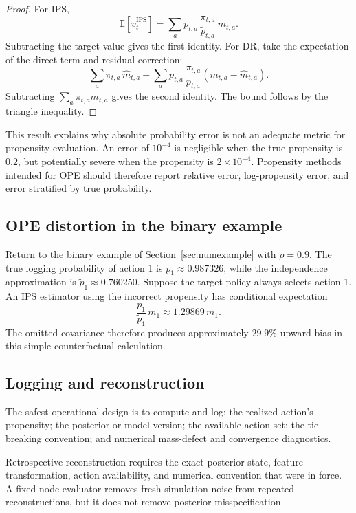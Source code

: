 \documentclass[11pt]{article}
\newcommand{\E}{\mathbb{E}}
\begin{document}
\begin{proof}
For IPS,
\[
\E[\widetilde v_t^{\mathrm{IPS}}]
=
\sum_a p_{t,a}\, \frac{\pi_{t,a}}{\widetilde p_{t,a}}\, m_{t,a}.
\]
Subtracting the target value gives the first identity. For DR, take the expectation of the direct term and residual correction:
\[
\sum_a \pi_{t,a}\, \widehat m_{t,a}
+
\sum_a p_{t,a}\, \frac{\pi_{t,a}}{\widetilde p_{t,a}} (m_{t,a} - \widehat m_{t,a}).
\]
Subtracting $\sum_a \pi_{t,a} m_{t,a}$ gives the second identity. The bound follows by the triangle inequality.
\end{proof}

This result explains why absolute probability error is not an adequate metric for propensity evaluation. An error of $10^{-4}$ is negligible when the true propensity is $0.2$, but potentially severe when the propensity is $2 \times 10^{-4}$. Propensity methods intended for OPE should therefore report relative error, log-propensity error, and error stratified by true probability.

\subsection{OPE distortion in the binary example}

Return to the binary example of Section~\ref{sec:numexample} with $\rho = 0.9$. The true logging probability of action 1 is $p_1 \approx 0.987326$, while the independence approximation is $\widetilde p_1 \approx 0.760250$. Suppose the target policy always selects action 1. An IPS estimator using the incorrect propensity has conditional expectation
\[
\frac{p_1}{\widetilde p_1}\, m_1 \approx 1.29869\, m_1.
\]
The omitted covariance therefore produces approximately $29.9\%$ upward bias in this simple counterfactual calculation.

\subsection{Logging and reconstruction}

The safest operational design is to compute and log: the realized action's propensity; the posterior or model version; the available action set; the tie-breaking convention; and numerical mass-defect and convergence diagnostics.

Retrospective reconstruction requires the exact posterior state, feature transformation, action availability, and numerical convention that were in force. A fixed-node evaluator removes fresh simulation noise from repeated reconstructions, but it does not remove posterior misspecification.
\end{document}

